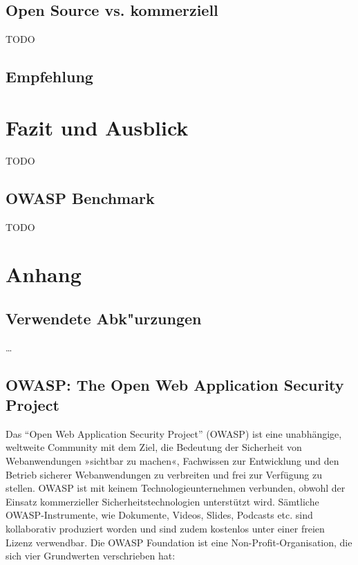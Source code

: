\documentclass[12pt,oneside,a4paper,parskip]{scrbook}
\begin{document}
  \section{Open Source vs. kommerziell}
  TODO
  \section{Empfehlung}


\chapter{Fazit und Ausblick}
TODO
  \section{OWASP Benchmark}
  TODO


\backmatter



\cleardoublepage
{}
{}
\printbibliography[title=Quellenverzeichnis]

\appendix
  \chapter*{Anhang}

  \section{Verwendete Abk"urzungen}
  \dots{}

  \section{OWASP: The Open Web Application Security Project}
  Das ``Open Web Application Security Project'' (OWASP) ist eine unabhängige, weltweite Community mit dem Ziel, die Bedeutung der Sicherheit von Webanwendungen »sichtbar zu machen«, Fachwissen zur Entwicklung und den Betrieb sicherer Webanwendungen zu verbreiten und frei zur Verfügung zu stellen.
  OWASP ist mit keinem Technologieunternehmen verbunden, obwohl der Einsatz kommerzieller Sicherheitstechnologien unterstützt wird. Sämtliche OWASP-Instrumente, wie Dokumente, Videos, Slides, Podcasts etc. sind kollaborativ produziert worden und sind zudem kostenlos unter einer freien Lizenz verwendbar. Die OWASP Foundation ist eine Non-Profit-Organisation, die sich vier Grundwerten verschrieben hat:
\end{document}

